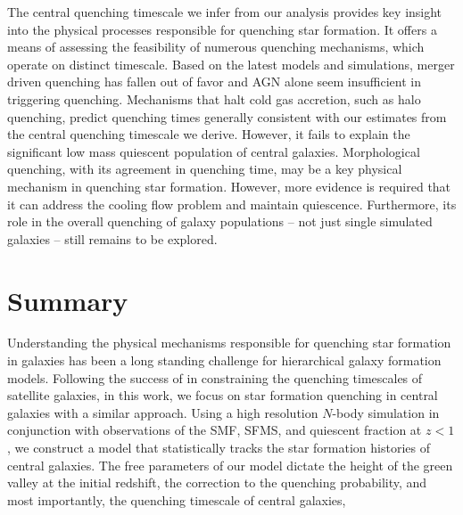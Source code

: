 The central quenching timescale we infer from our analysis provides key insight
into the physical processes responsible for quenching star formation. It offers 
a means of assessing the feasibility of numerous quenching mechanisms, which
operate on distinct timescale. Based on the latest models and simulations, 
merger driven quenching has fallen out of favor 
and AGN alone seem insufficient in triggering quenching. 
Mechanisms that halt cold gas accretion, such as halo quenching, predict 
quenching times generally consistent with our estimates from the central 
quenching timescale we derive. However, it fails to explain the significant 
low mass quiescent population of central galaxies. Morphological quenching, 
with its agreement in quenching time, may be a key physical mechanism 
in quenching star formation. However, more evidence is required that it 
can address the cooling flow problem and maintain quiescence. Furthermore, 
its role in the overall quenching of galaxy populations -- not just 
single simulated galaxies -- still remains to be explored.  

\section{Summary} \label{sec:summary}
Understanding the physical mechanisms responsible for quenching 
star formation in galaxies has been a long standing challenge 
for hierarchical galaxy formation models. Following the success 
of \cite{Wetzel:2013aa} in constraining the quenching timescales 
of satellite galaxies, in this work, we focus on star formation 
quenching in central galaxies with a similar approach. 
Using a high resolution $N$-body simulation in conjunction with 
observations of the SMF, SFMS, and quiescent fraction at $z < 1$, 
we construct a model that statistically tracks the star formation 
histories of central galaxies. The free parameters of our model 
dictate the height  of the green valley at the initial redshift, 
the correction to the quenching probability, and most importantly,
the quenching timescale of central galaxies, 

